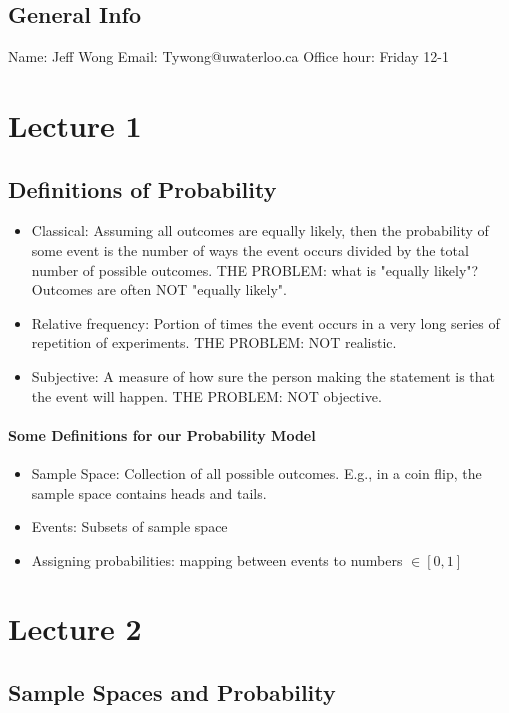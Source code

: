 \documentclass[10pt,letter]{article}
\begin{document}
\subsection*{General Info}
Name: Jeff Wong \quad Email: Tywong@uwaterloo.ca \quad Office hour: Friday 12-1 
\section*{Lecture 1}

\subsection*{Definitions of Probability}
\begin{itemize}
    \item Classical: Assuming all outcomes are equally likely, then the probability of some event is the number of ways the event occurs divided by the total number of possible outcomes. THE PROBLEM: what is "equally likely"? Outcomes are often NOT "equally likely".
    \item Relative frequency: Portion of times the event occurs in a very long series of repetition of experiments. THE PROBLEM: NOT realistic.
    \item Subjective: A measure of how sure the person making the statement is that the event will happen. THE PROBLEM: NOT objective. 
\end{itemize}

\paragraph{Some Definitions for our Probability Model}
\begin{itemize}
    \item Sample Space: Collection of all possible outcomes. E.g., in a coin flip, the sample space contains heads and tails.
    \item Events: Subsets of sample space
    \item Assigning probabilities: mapping between events to numbers $\in[0,1]$
\end{itemize}

\section*{Lecture 2}
\subsection*{Sample Spaces and Probability} 
\end{document}
